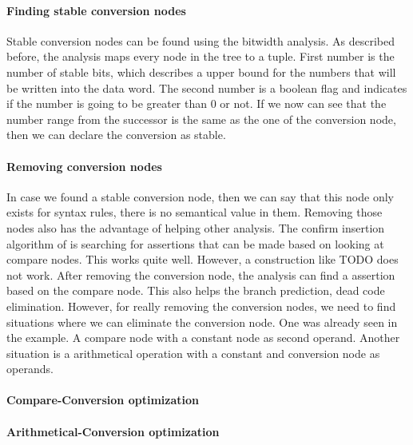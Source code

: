 \paragraph{Finding stable conversion nodes}
Stable conversion nodes can be found using the bitwidth analysis. As described before, the analysis maps every node in the tree to a tuple. First number is the number of stable bits, which describes a upper bound for the numbers that will be written into the data word. The second number is a boolean flag and indicates if the number is going to be greater than 0 or not. If we now can see that the number range from the successor is the same as the one of the conversion node, then we can declare the conversion as stable.

\paragraph{Removing conversion nodes}
In case we found a stable conversion node, then we can say that this node only exists for syntax rules, there is no semantical value in them. Removing those nodes also has the advantage of helping other analysis. The confirm insertion algorithm of \libFIRM is searching for assertions that can be made based on looking at compare nodes. This works quite well. However, a construction like TODO does not work.
After removing the conversion node, the analysis can find a assertion based on the compare node. This also helps the branch prediction, dead code elimination. \newline
However, for really removing the conversion nodes, we need to find situations where we can eliminate the conversion node. One was already seen in the example. A compare node with a constant node as second operand. Another situation is a arithmetical operation with a constant and conversion node as operands.

\paragraph{Compare-Conversion optimization}
\paragraph{Arithmetical-Conversion optimization}
